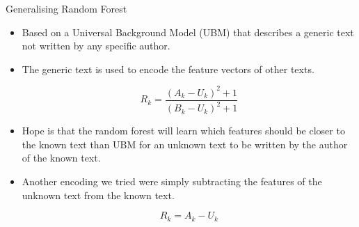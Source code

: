 \documentclass[10pt]{beamer}
\begin{document}




\begin{frame}[fragile]{Generalising Random Forest}

    \begin{itemize}
        \item Based on a Universal Background Model (UBM) that describes a
            generic text not written by any specific author.
        \item The generic text is used to encode the feature vectors of other
            texts.

            \begin{equation}
                R_k = \frac{(A_k - U_k)^2 + 1}{(B_k - U_k)^2 + 1}
            \end{equation}
        \item Hope is that the random forest will learn which features should be
            closer to the known text than UBM for an unknown text to be written
            by the author of the known text.
        \item Another encoding we tried were simply subtracting the features of
            the unknown text from the known text.

            \begin{equation}
                R_k = A_k - U_k
            \end{equation}
    \end{itemize}

\end{frame}
\end{document}
